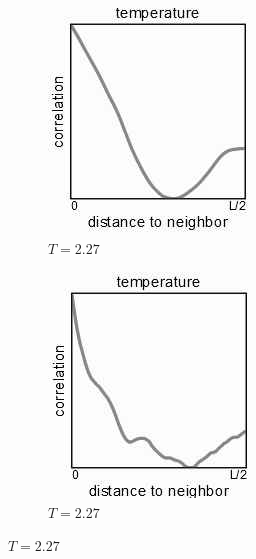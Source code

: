 \documentclass[]{article}
\begin{document}
\begin{figure}[H]
\begin{subfigure}[t]{0.24\textwidth}
	\end{subfigure}
	\begin{subfigure}[t]{0.24\textwidth}
		\caption{$T=2.27$}
		\includegraphics[width=\textwidth]{ising-correlation3}
	\end{subfigure}
	\begin{subfigure}[t]{0.24\textwidth}
		\caption{$T=2.27$}
		\includegraphics[width=\textwidth]{ising-correlation4}
	\end{subfigure}
\end{figure}
\end{document}
